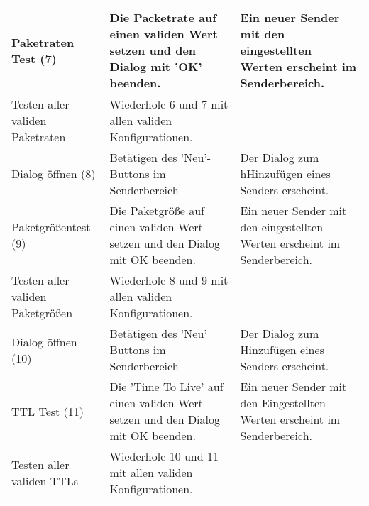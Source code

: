 \begin{table}[h]
\begin{center}
\begin{tabular}{|p{2.5cm}|p{5cm}|p{4.55cm}|}
\hline
Paketraten Test (7) & Die Packetrate auf einen validen Wert setzen und den
 Dialog mit 'OK' beenden. & Ein neuer Sender mit den eingestellten Werten
 erscheint im Senderbereich.
\\
\hline
Testen aller validen Paketraten & Wiederhole 6 und 7 mit allen validen
 Konfigurationen. &
\\
\hline
Dialog öffnen (8) & Betätigen des 'Neu'-Buttons im Senderbereich & Der Dialog
 zum hHinzufügen eines Senders erscheint.
\\
\hline
Paketgrößentest (9) & Die Paketgröße auf einen validen Wert setzen und den
 Dialog mit OK beenden. & Ein neuer Sender mit den eingestellten Werten erscheint im
 Senderbereich.
\\
\hline
 Testen aller validen Paketgrößen & Wiederhole 8 und 9 mit allen validen
 Konfigurationen. &
\\
\hline
Dialog öffnen (10) & Betätigen des 'Neu' Buttons im Senderbereich & Der Dialog
 zum Hinzufügen eines Senders erscheint.
\\
\hline
TTL Test (11) & Die 'Time To Live' auf einen validen Wert setzen und den Dialog
 mit OK beenden. & Ein neuer Sender mit den Eingestellten Werten erscheint im
 Senderbereich.
\\
\hline
Testen aller validen TTLs & Wiederhole 10 und 11 mit allen validen
 Konfigurationen. &
\\
\hline
\end{tabular}
\end{center}
\end{table}

